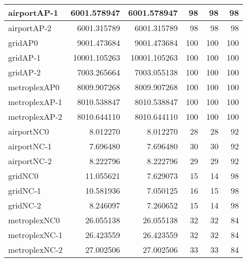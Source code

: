 \begin{longtable}{|l|r|r|r|r|r|}
airportAP-1 & 6001.578947 & 6001.578947 & 98 & 98 & 98 \\ \hline
airportAP-2 & 6001.315789 & 6001.315789 & 98 & 98 & 98 \\ \hline
gridAP0 & 9001.473684 & 9001.473684 & 100 & 100 & 100 \\ \hline
gridAP-1 & 10001.105263 & 10001.105263 & 100 & 100 & 100 \\ \hline
gridAP-2 & 7003.265664 & 7003.055138 & 100 & 100 & 100 \\ \hline
metroplexAP0 & 8009.907268 & 8009.907268 & 100 & 100 & 100 \\ \hline
metroplexAP-1 & 8010.538847 & 8010.538847 & 100 & 100 & 100 \\ \hline
metroplexAP-2 & 8010.644110 & 8010.644110 & 100 & 100 & 100 \\ \hline
airportNC0 & 8.012270 & 8.012270 & 28 & 28 & 92 \\ \hline
airportNC-1 & 7.696480 & 7.696480 & 30 & 30 & 92 \\ \hline
airportNC-2 & 8.222796 & 8.222796 & 29 & 29 & 92 \\ \hline
gridNC0 & 11.055621 & 7.629073 & 15 & 14 & 98 \\ \hline
gridNC-1 & 10.581936 & 7.050125 & 16 & 15 & 98 \\ \hline
gridNC-2 & 8.246097 & 7.260652 & 15 & 14 & 98 \\ \hline
metroplexNC0 & 26.055138 & 26.055138 & 32 & 32 & 84 \\ \hline
metroplexNC-1 & 26.423559 & 26.423559 & 32 & 32 & 84 \\ \hline
metroplexNC-2 & 27.002506 & 27.002506 & 33 & 33 & 84 \\ \hline
\end{longtable}

